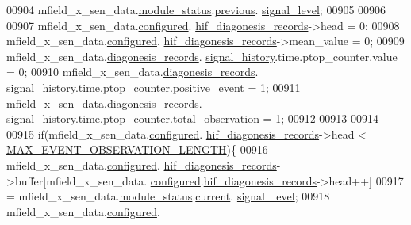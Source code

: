 \begin{DoxyCode}
{{00904                        mfield\_x\_sen\_data.\hyperlink{a00025_adfab5a5d8b45a93dfb13edb24e2b80e3}{module\_status}.\hyperlink{a00019_adcb859b2f3983a9c58deab28e59c333f}{previous}.
      \hyperlink{a00019_a4070db8eab0ff93e3fbc1df59872f117}{signal\_level};
00905 
00906 
00907                        mfield\_x\_sen\_data.\hyperlink{a00025_a94b2d1f6ea4ab334c74d24984dd27843}{configured}.
      \hyperlink{a00021_ae18294f7499d9fcb5ec796a1816b8cd8}{hif\_diagonesis\_records}->head                                = 0;
00908                        mfield\_x\_sen\_data.\hyperlink{a00025_a94b2d1f6ea4ab334c74d24984dd27843}{configured}.
      \hyperlink{a00021_ae18294f7499d9fcb5ec796a1816b8cd8}{hif\_diagonesis\_records}->mean\_value                          = 0;
00909                        mfield\_x\_sen\_data.\hyperlink{a00025_a2bd79ce84bbd6b7f50d38954f7ae475e}{diagonesis\_records}.
      \hyperlink{a00019_ab7038f4de1f77b52a7f89e9f77c0b846}{signal\_history}.time.ptop\_counter.value              = 0;
00910                        mfield\_x\_sen\_data.\hyperlink{a00025_a2bd79ce84bbd6b7f50d38954f7ae475e}{diagonesis\_records}.
      \hyperlink{a00019_ab7038f4de1f77b52a7f89e9f77c0b846}{signal\_history}.time.ptop\_counter.positive\_event     = 1;
00911                        mfield\_x\_sen\_data.\hyperlink{a00025_a2bd79ce84bbd6b7f50d38954f7ae475e}{diagonesis\_records}.
      \hyperlink{a00019_ab7038f4de1f77b52a7f89e9f77c0b846}{signal\_history}.time.ptop\_counter.total\_observation  = 1;
00912 
00913 
00914 
00915                        \textcolor{keywordflow}{if}(mfield\_x\_sen\_data.\hyperlink{a00025_a94b2d1f6ea4ab334c74d24984dd27843}{configured}.
      \hyperlink{a00021_ae18294f7499d9fcb5ec796a1816b8cd8}{hif\_diagonesis\_records}->head < 
      \hyperlink{a00022_aa060aeb1ecb530b3c6f6d91060999b70}{MAX\_EVENT\_OBSERVATION\_LENGTH})\{
00916                        mfield\_x\_sen\_data.\hyperlink{a00025_a94b2d1f6ea4ab334c74d24984dd27843}{configured}.
      \hyperlink{a00021_ae18294f7499d9fcb5ec796a1816b8cd8}{hif\_diagonesis\_records}->buffer[mfield\_x\_sen\_data.
      \hyperlink{a00025_a94b2d1f6ea4ab334c74d24984dd27843}{configured}.\hyperlink{a00021_ae18294f7499d9fcb5ec796a1816b8cd8}{hif\_diagonesis\_records}->head++]
00917                        = mfield\_x\_sen\_data.\hyperlink{a00025_adfab5a5d8b45a93dfb13edb24e2b80e3}{module\_status}.\hyperlink{a00019_acf41ffc11da291c2f9f0fcb02ee72b98}{current}.
      \hyperlink{a00019_a4070db8eab0ff93e3fbc1df59872f117}{signal\_level};
00918                        mfield\_x\_sen\_data.\hyperlink{a00025_a94b2d1f6ea4ab334c74d24984dd27843}{configured}.
}}
\end{DoxyCode}

